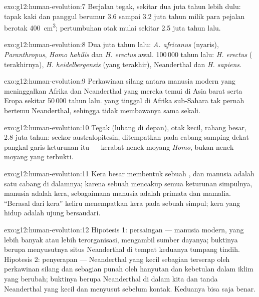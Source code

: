 \begin{solution}{exo:g12:human-evolution:7}
Berjalan tegak, sekitar dua juta tahun lebih dulu: tapak kaki dan
panggul berumur 3.6 sampai 3.2 juta tahun milik para pejalan berotak
\qty{400}{cm^3}; pertumbuhan otak mulai sekitar 2.5 juta tahun lalu.
\end{solution}

\begin{solution}{exo:g12:human-evolution:8}
Dua juta tahun lalu: \emph{A. africanus} (nyaris), \emph{Paranthropus},
\emph{Homo habilis} dan \emph{H. erectus} awal. 100\,000 tahun lalu:
\emph{H. erectus} ( terakhirnya), \emph{H. heidelbergensis}
(yang terakhir), Neanderthal dan \emph{H. sapiens}.
\end{solution}

\begin{solution}{exo:g12:human-evolution:9}
Perkawinan silang antara manusia modern yang meninggalkan Afrika dan
Neanderthal yang mereka temui di Asia barat serta Eropa sekitar
50\,000 tahun lalu.  yang tinggal di Afrika sub-Sahara tak
pernah bertemu Neanderthal, sehingga tidak membawanya sama sekali.
\end{solution}

\begin{solution}{exo:g12:human-evolution:10}
Tegak (lubang di depan), otak kecil, rahang besar, 2.8 juta tahun:
seekor australopitesin, ditempatkan pada cabang samping dekat pangkal
garis keturunan itu --- kerabat nenek moyang \emph{Homo}, bukan nenek
moyang yang terbukti.
\end{solution}

\begin{solution}{exo:g12:human-evolution:11}
Kera besar membentuk sebuah , dan manusia adalah satu cabang di
dalamnya; karena sebuah  mencakup semua keturunan simpulnya,
manusia adalah kera, sebagaimana manusia adalah primata dan mamalia.
``Berasal dari kera'' keliru menempatkan kera pada sebuah simpul; kera
yang hidup adalah ujung bersaudari.
\end{solution}

\begin{solution}{exo:g12:human-evolution:12}
Hipotesis 1: persaingan --- manusia modern, yang lebih banyak atau
lebih terorganisasi, mengambil sumber dayanya; buktinya berupa
menyusutnya situs Neanderthal di tempat keduanya tumpang tindih.
Hipotesis 2: penyerapan ---  Neanderthal yang kecil sebagian
terserap oleh perkawinan silang dan sebagian punah oleh hanyutan dan
kebetulan dalam iklim yang berubah; buktinya berupa  Neanderthal di
dalam kita dan tanda  Neanderthal yang kecil dan menyusut
sebelum kontak. Keduanya bisa saja benar.
\end{solution}

